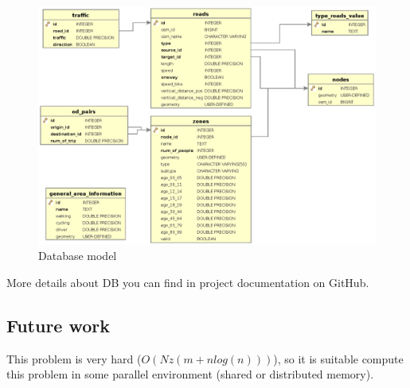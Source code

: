 \begin{figure}
\centering
\includegraphics[width=15cm]{img/c01-transp-model/db.eps}
\caption{Database model}
\end{figure}

More details about DB you can find in project documentation on GitHub.

\subsection{Future work}
This problem is very hard ($O(N z (m + n log(n)))$), so it is suitable compute this problem in some parallel environment (shared or distributed memory).

